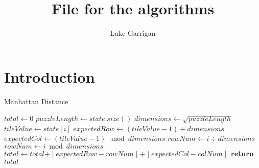 \documentclass[progress]{cmpreport}
\title{File for the algorithms}
\author{Luke Garrigan}
\begin{document}
	
	
	\section{Introduction}

	

	\makeatletter
	\def\BState{\State\hskip-\ALG@thistlm}
	\makeatother
	
	\begin{algorithm}
		\caption{Manhattan Distance}\label{Manhattan Distance}
		\begin{algorithmic}[1]
				
			\State$total\gets 0$
			\State$puzzleLength\gets state.size()$
			\State$dimensions\gets \sqrt{puzzleLength}$
				
				\State $tileValue\gets state[i]$
				\State $expectedRow\gets (tileValue -1)\div dimensions$
				\State $expectedCol\gets (tileValue -1)\mod dimensions$
				\State $rowNum \gets i\div dimensions$
				\State $rowNum\gets i \bmod dimensions$
				\State $total\gets total \texttt{+} \mid{expectedRow-rowNum}\mid\texttt{+}\mid{expectedCol-colNum}\mid$
			\EndFor
			\State \textbf{return} $total$
			\EndProcedure
		\end{algorithmic}
	\end{algorithm}

	
	
\end{document}
